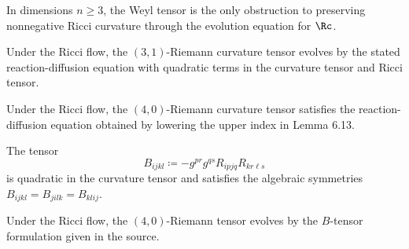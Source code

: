 \begin{remark}
\label{ch06-rem-weyl-obstruction}

In dimensions \(n\ge 3\), the Weyl tensor is the only obstruction to preserving nonnegative Ricci curvature through the evolution equation for \(\Rc\).
\end{remark}

\begin{lemma}
\label{ch06-lem-riemann-curvature-evolution}

Under the Ricci flow, the \((3,1)\)-Riemann curvature tensor evolves by the stated reaction-diffusion equation with quadratic terms in the curvature tensor and Ricci tensor.
\end{lemma}

\begin{corollary}
\label{ch06-cor-riemann-curvature-evolution-four-zero}

Under the Ricci flow, the \((4,0)\)-Riemann curvature tensor satisfies the reaction-diffusion equation obtained by lowering the upper index in Lemma 6.13.
\end{corollary}

\begin{lemma}
\label{ch06-lem-quadratic-tensor-B}

The tensor
\[
B_{ijkl} \coloneqq -g^{pr}g^{qs} R_{ipjq}R_{kr\ell s}
\]
is quadratic in the curvature tensor and satisfies the algebraic symmetries \(B_{ijkl}=B_{jilk}=B_{klij}\).
\end{lemma}

\begin{lemma}
\label{ch06-lem-alternative-riemann-evolution}

Under the Ricci flow, the \((4,0)\)-Riemann tensor evolves by the \(B\)-tensor formulation given in the source.
\end{lemma}

